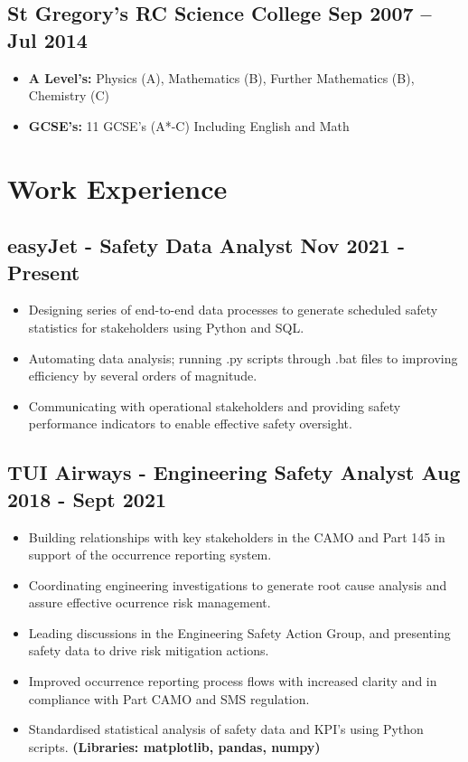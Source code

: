\documentclass[a4paper,9pt]{article}
\begin{document}
\subsection*{\textbf{St Gregory’s RC Science College} \hfill  Sep 2007 – Jul 2014}
\begin{itemize}[noitemsep]
    \item \textbf{A Level's:} Physics (A), Mathematics (B), Further Mathematics (B), Chemistry (C)
    \item \textbf{GCSE’s:} 11 GCSE’s (A*-C) Including English and Math
\end{itemize}

\section*{Work Experience}
\subsection*{\textbf{easyJet - Safety Data Analyst} \hfill  Nov 2021 - Present}
\begin{itemize}[noitemsep]
	\item Designing series of end-to-end data processes to generate scheduled safety statistics for stakeholders using Python and SQL.
	\item Automating data analysis; running .py scripts through .bat files to improving efficiency by several orders of magnitude.
	\item Communicating with operational stakeholders and providing safety performance indicators to enable effective safety oversight.

\end{itemize}

\subsection*{\textbf{TUI Airways - Engineering Safety Analyst} \hfill  Aug 2018 - Sept 2021}
\begin{itemize}[noitemsep]
	\item Building relationships with key stakeholders in the CAMO and Part 145 in support of the occurrence reporting system.
	\item Coordinating engineering investigations to generate root cause analysis and assure effective ocurrence risk management.
	\item Leading discussions in the Engineering Safety Action Group, and presenting safety data to drive risk mitigation actions.
	\item Improved occurrence reporting process flows with increased clarity and in compliance with Part CAMO and SMS regulation.
	\item Standardised statistical analysis of safety data and KPI's using Python scripts. \textbf{(Libraries: matplotlib, pandas, numpy)}
\end{itemize}
\end{document}
